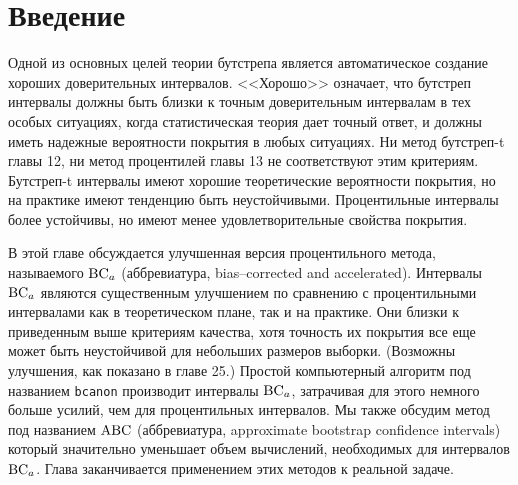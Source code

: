 \section{Введение}
Одной из основных целей теории бутстрепа является автоматическое создание хороших доверительных интервалов. <<Хорошо>> означает, что бутстреп интервалы должны быть близки к точным доверительным интервалам в тех особых ситуациях, когда статистическая теория дает точный ответ, и должны иметь надежные вероятности покрытия в любых ситуациях. Ни метод бутстреп-t главы 12, ни метод процентилей главы 13 не соответствуют этим критериям. Бутстреп-t интервалы имеют хорошие теоретические вероятности покрытия, но на практике имеют тенденцию быть неустойчивыми. Процентильные интервалы более устойчивы, но имеют менее удовлетворительные свойства покрытия.

В этой главе обсуждается улучшенная версия процентильного метода, называемого $\mathrm{BC}_a$ (аббревиатура, bias–corrected and accelerated). Интервалы $\mathrm{BC}_a$ являются существенным улучшением по сравнению с процентильными интервалами как в теоретическом плане, так и на практике. Они близки к приведенным выше критериям качества, хотя точность их покрытия все еще может быть неустойчивой для небольших размеров выборки. (Возможны улучшения, как показано в главе 25.) Простой компьютерный алгоритм под названием \texttt{bcanon} производит интервалы $\mathrm{BC}_a$, затрачивая для этого немного больше усилий, чем для процентильных интервалов. Мы также обсудим метод под названием $\mathrm{ABC}$ (аббревиатура, approximate bootstrap confidence intervals) который значительно уменьшает объем вычислений, необходимых для интервалов $\mathrm{BC}_a$. Глава заканчивается применением этих методов к реальной задаче.
